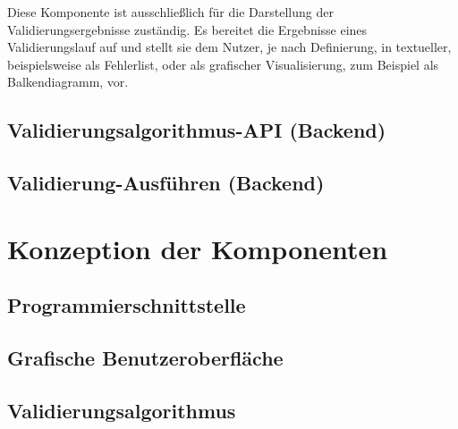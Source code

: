 Diese Komponente ist ausschließlich für die Darstellung der Validierungsergebnisse zuständig. Es bereitet die Ergebnisse eines Validierungslauf auf und stellt sie dem Nutzer, je nach Definierung, in textueller, beispielsweise als Fehlerlist, oder als grafischer Visualisierung, zum Beispiel als Balkendiagramm,  vor.

\subsection*{Validierungsalgorithmus-API (Backend)}



\subsection*{Validierung-Ausführen (Backend)}

\section{Konzeption der Komponenten}



\subsection{Programmierschnittstelle}


\subsection{Grafische Benutzeroberfläche}



\subsection{Validierungsalgorithmus}